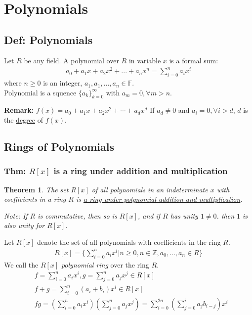 \documentclass[11pt,a4paper]{article}
\newtheorem{theorem}{Theorem}
\begin{document}
\section{Polynomials}
\subsection{Def: Polynomials}
Let $R$ be any field. A polynomial over $R$ in variable $x$ is a formal sum:
\begin{equation}
    \begin{aligned}
        a_0+a_1x+a_2x^2+...+a_nx^n=\sum_{i=0}^na_ix^i
    \end{aligned}
    \nonumber
\end{equation}
where $n\geq 0$ is an integer, $a_1,a_1,...,a_n\in\mathbb{F}$.\\
Polynomial is a squence $\{a_k\}_{k=0}^{\infty}$ with $a_m=0,\forall m>n$.

\textbf{Remark:} $f(x)=a_0+a_1x+a_2x^2+\cdots+a_dx^d$ If $a_d\neq 0$ and $a_i=0,\forall i>d$, $d$ is the \underline{degree} of $f(x)$.

\subsection{Rings of Polynomials}
\subsubsection{Thm: $R[x]$ is a ring under addition and multiplication}
\begin{theorem}
    The set $R[x]$ of all polynomials in an indeterminate $x$ with coefficients in a ring $R$ is \underline{a ring under polynomial addition and multiplication}.
    
    Note: If $R$ is commutative, then so is $R[x]$,
    and if $R$ has unity $1\neq 0$. then $1$ is also unity for $R[x]$.
\end{theorem}
Let $R[x]$ denote the set of all polynomials with coefficients in the ring $R$.
\begin{equation}
    \begin{aligned}
        R[x]=\{\sum_{i=0}^na_ix^i|n\geq0,n\in\mathbb{Z}, a_0,...,a_n\in R\}
    \end{aligned}
    \nonumber
\end{equation}
We call the $R[x]$ \textit{polynomial ring} over the ring $R$.
\begin{equation}
    \begin{aligned}
        &f=\sum_{i=0}^na_ix^i, g=\sum_{j=0}^na_jx^j \in R[x]\\
        &f+g=\sum_{i=0}^n(a_i+b_i)x^i\in R[x]\\
        &fg=(\sum_{i=0}^na_ix^i)(\sum_{j=0}^na_jx^j)=\sum_{i=0}^{2n}(\sum_{j=0}^ia_jb_{i-j})x^i
    \end{aligned}
    \nonumber
\end{equation}
\end{document}
